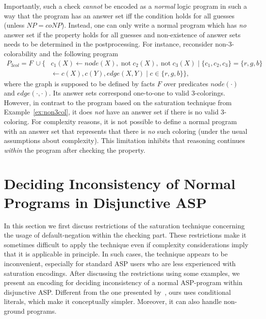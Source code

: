 \documentclass[11pt,fleqn,twoside]{article}
\def\naf{\ensuremath{\mathop{not}}}
\begin{document}
		Importantly, such a check \emph{cannot} be encoded as a \emph{normal} logic program in such a way that the program has an answer set iff the condition holds for all guesses (unless $\mathit{NP}=\mathit{coNP}$).
		Instead, one can only write a normal program which has \emph{no} answer set if the property holds for all guesses
		and non-existence of answer sets needs to be determined in the postprocessing.
		For instance, reconsider non-3-colorability and the following program
		{
		\begin{align*}
			P_{\mathit{3col}} = F \ \cup \{ & \mathit{c_1}(X) \leftarrow \mathit{node}(X), \naf \mathit{c_2}(X), \naf \mathit{c_3}(X) \mid \{ c_1, c_2, c_3 \} = \{ r, g, b \} \\
								& \leftarrow c(X), c(Y), \mathit{edge}(X,Y) \mid c \in \{ \mathit{r}, \mathit{g}, \mathit{b} \} \}\text{,}
		\end{align*}
		}
		where the graph is supposed to be defined by facts $F$ over predicates $\mathit{node}(\cdot)$ and $\mathit{edge}(\cdot, \cdot)$.
		Its answer sets correspond one-to-one to valid 3-colorings. However, in contrast to the program based on the saturation technique from Example~\ref{ex:non3col},
		it does \emph{not} have an answer set if there is no valid 3-coloring.
		For complexity reasons, it is not possible to define a normal program with an answer set that represents that there is \emph{no} such coloring (under the usual assumptions about complexity).
		This limitation inhibits that reasoning continues \emph{within} the program after checking the property.

	\section{Deciding Inconsistency of Normal Programs in Disjunctive ASP}
	\label{sec:embedding}

		In this section we first discuss restrictions of the saturation technique concerning the usage of default-negation within the checking part.
		These restrictions make it sometimes difficult to apply the technique even if complexity considerations imply that it is applicable in principle.
		In such cases, the technique appears to be inconvenient, especially for standard ASP users who are less experienced with saturation encodings.
		After discussing the restrictions using some examples, we present an encoding for deciding inconsistency of a normal ASP-program
		within disjunctive ASP.
		Different from the one presented by~, ours uses conditional literals, which make it conceptually simpler.
		Moreover, it can also handle non-ground programs.
	
\end{document}

